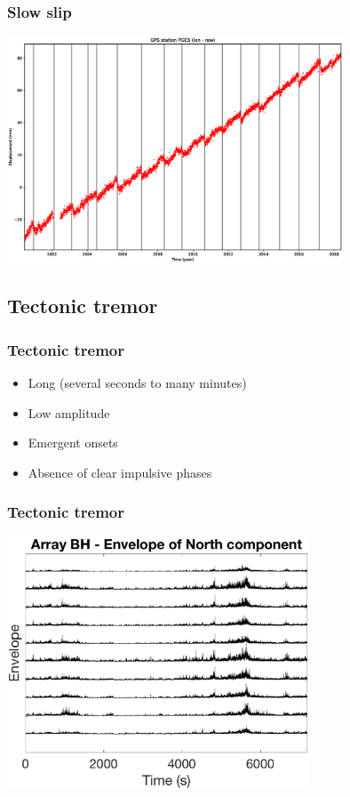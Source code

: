 \documentclass{beamer}
\begin{document}
	\begin{frame}
		\frametitle{Slow slip}
		\begin{center}
			\includegraphics[trim={0cm 0cm 0cm 0cm}, clip, width=10cm]{slowslip/slow_slip_GPS.eps}
		\end{center}
	\end{frame}


	\subsection{Tectonic tremor}

	\begin{frame}
		\frametitle{Tectonic tremor}
		\begin{itemize}
			\item Long (several seconds to many minutes)
			\item Low amplitude
			\item Emergent onsets
			\item Absence of clear impulsive phases
		\end{itemize}
	\end{frame}

	\begin{frame}
		\frametitle{Tectonic tremor}
		\begin{center}
			\includegraphics[trim={0cm 0cm 0cm 0cm}, clip, width=9cm]{ETS/tremor.eps}
		\end{center}
	\end{frame}
\end{document}
